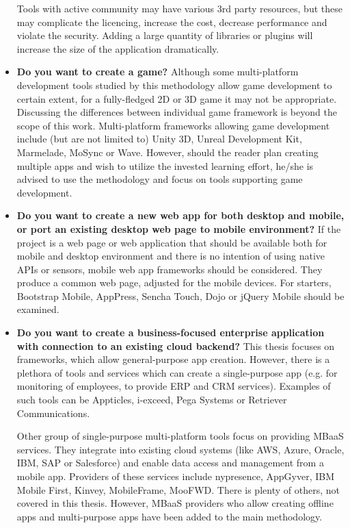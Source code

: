 \documentclass[english,master,public,dept460,male,cpdeclaration,oneside]{diploma}
\begin{document}
\begin{itemize}
	Tools with active community may have various 3rd party resources, but these may complicate the licencing, increase the cost, decrease performance and violate the security. Adding a large quantity of libraries or plugins will increase the size of the application dramatically. 
	
	\item \textbf{Do you want to create a game?} 
	Although some multi-platform development tools studied by this methodology allow game development to certain extent, for a fully-fledged 2D or 3D game it may not be appropriate. Discussing the differences between individual game framework is beyond the scope of this work. Multi-platform frameworks allowing game development include (but are not limited to) Unity 3D, Unreal Development Kit, Marmelade, MoSync or Wave. However, should the reader plan creating multiple apps and wish to utilize the invested learning effort, he/she is advised to use the methodology and focus on tools supporting game development.
	
	\item \textbf{Do you want to create a new web app for both desktop and mobile, or port an existing desktop web page to mobile environment?} 
	If the project is a web page or web application that should be available both for mobile and desktop environment and there is no intention of using native APIs or sensors, mobile web app frameworks should be considered. They produce a common web page, adjusted for the mobile devices. For starters, Bootstrap Mobile, AppPress, Sencha Touch, Dojo or jQuery Mobile should be examined. 
	
	\item \textbf{Do you want to create a business-focused enterprise application with connection to an existing cloud backend?}
	This thesis focuses on frameworks, which allow general-purpose app creation. However, there is a plethora of tools and services which can create a single-purpose app (e.g. for monitoring of employees, to provide ERP and CRM services). Examples of such tools can be Appticles, i-exceed, Pega Systems or Retriever Communications. 
	
	Other group of single-purpose multi-platform tools focus on providing MBaaS services. They integrate into existing cloud systems (like AWS, Azure, Oracle, IBM, SAP or Salesforce) and enable data access and management from a mobile app. Providers of these services include nypresence, AppGyver, IBM Mobile First, Kinvey, MobileFrame, MooFWD. There is plenty of others, not covered in this thesis. However, MBaaS providers who allow creating offline apps and multi-purpose apps have been added to the main methodology.
\end{itemize}
\end{document}
